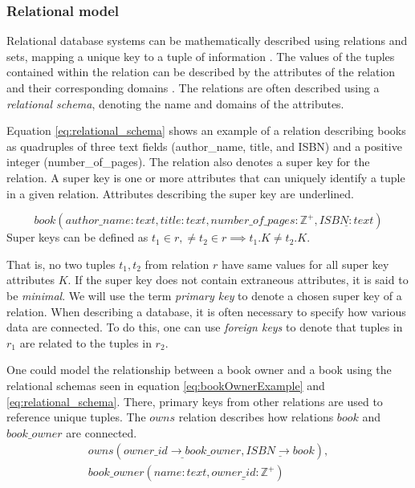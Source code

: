 \subsubsection*{Relational model}
Relational database systems can be mathematically described using relations and sets, mapping a unique key to a tuple of information \cite[Chapter~2.3]{DBSBook}.
The values of the tuples contained within the relation can be described by the attributes of the relation and their corresponding domains \cite{KatjaFirstPP}. 
The relations are often described using a \textit{relational schema}, denoting the name and domains of the attributes.


Equation \ref{eq:relational_schema} shows an example of a relation describing books as quadruples of three text fields (author\_name, title, and ISBN) and a positive integer (number\_of\_pages).
The relation also denotes a super key for the relation. A super key is one or more attributes that can uniquely identify a tuple in a given relation. Attributes describing the super key are underlined.

\begin{equation} \label{eq:relational_schema}
    book(author\_name:text, title: text, number\_of\_pages:\mathbb{Z}^+, \underline{ISBN: text})
\end{equation}
Super keys can be defined as $t_1 \in r,\neq t_2 \in r \implies t_1.K \neq t_2.K$. 

That is, no two tuples $t_1, t_2$ from relation $r$ have same values for all super key attributes $K$. 
If the super key does not contain extraneous attributes, it is said to be \textit{minimal}. \cite[Chapter 2.3]{DBSBook}
We will use the term \textit{primary key} to denote a chosen super key of a relation. 
When describing a database, it is often necessary to specify how various data are connected. 
To do this, one can use \textit{foreign keys} to denote that tuples in $r_1$ are related to the tuples in $r_2$.


One could model the relationship between a book owner and a book using the relational schemas seen in equation \ref{eq:bookOwnerExample} and \ref{eq:relational_schema}.
There, primary keys from other relations are used to reference unique tuples. The $owns$ relation describes how relations $book$ and $book\_owner$ are connected. 
\begin{equation}\label{eq:bookOwnerExample}
    \begin{split}
        owns(\underline{owner\_id \rightarrow book\_owner}, \underline{ISBN \rightarrow book}), \\
        book\_owner(name:text,\underline{owner\_id:\mathbb{Z}^+})
    \end{split}
\end{equation}

